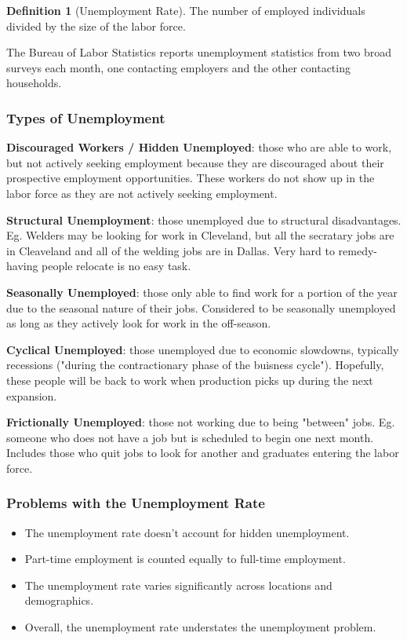 \documentclass[12pt, a4paper]{article}
\theoremstyle{definition}
\newtheorem{definition}{Definition}
\begin{document}
\begin{definition}[Unemployment Rate]
    The number of employed individuals divided by the size of the labor force.
\end{definition}

The Bureau of Labor Statistics reports unemployment statistics from two broad surveys each month, one contacting employers and the other contacting households.

\subsubsection{Types of Unemployment}

\textbf{Discouraged Workers / Hidden Unemployed}: those who are able to work, but not actively seeking employment because they are discouraged about their prospective employment opportunities.
These workers do not show up in the labor force as they are not actively seeking employment.

\textbf{Structural Unemployment}: those unemployed due to structural disadvantages.
Eg. Welders may be looking for work in Cleveland, but all the secratary jobs are in Cleaveland and all of the welding jobs are in Dallas.
Very hard to remedy- having people relocate is no easy task.

\textbf{Seasonally Unemployed}: those only able to find work for a portion of the year due to the seasonal nature of their jobs.
Considered to be seasonally unemployed as long as they actively look for work in the off-season.

\textbf{Cyclical Unemployed}: those unemployed due to economic slowdowns, typically recessions ("during the contractionary phase of the buisness cycle").
Hopefully, these people will be back to work when production picks up during the next expansion.

\textbf{Frictionally Unemployed}: those not working due to being "between" jobs.
Eg. someone who does not have a job but is scheduled to begin one next month.
Includes those who quit jobs to look for another and graduates entering the labor force.

\subsubsection{Problems with the Unemployment Rate}
\begin{itemize}
    \item The unemployment rate doesn't account for hidden unemployment.
    \item Part-time employment is counted equally to full-time employment.
    \item The unemployment rate varies significantly across locations and demographics.
    \item Overall, the unemployment rate understates the unemployment problem.
\end{itemize}
\end{document}
